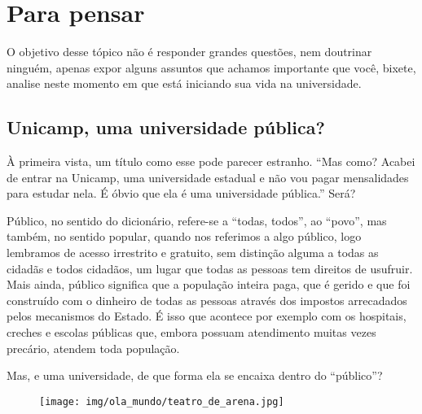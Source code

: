 
\section{Para pensar}

O objetivo desse tópico não é responder grandes questões, nem doutrinar
ninguém, apenas expor alguns assuntos que achamos importante que você, bixete,
analise neste momento em que está iniciando sua vida na universidade.

\subsection*{Unicamp, uma universidade pública?}

À primeira vista, um título como esse pode parecer estranho. ``Mas como? Acabei
de entrar na Unicamp, uma universidade estadual e não vou pagar mensalidades
para estudar nela. É óbvio que ela é uma universidade pública.'' Será?

Público, no sentido do dicionário, refere-se a ``todas, todos'', ao ``povo'',
mas também, no sentido popular, quando nos referimos a algo público, logo
lembramos de acesso irrestrito e gratuito, sem distinção alguma a todas as
cidadãs e todos cidadãos, um lugar que todas as pessoas tem direitos de
usufruir. Mais ainda, público significa que a população inteira paga, que é
gerido e que foi construído com o dinheiro de todas as pessoas através dos
impostos arrecadados pelos mecanismos do Estado. É isso que acontece por
exemplo com os hospitais, creches e escolas públicas que, embora possuam
atendimento muitas vezes precário, atendem toda população.

Mas, e uma universidade, de que forma ela se encaixa dentro do ``público''?

\begin{figure}[h!]
  \centering
  \texttt{[image: img/ola\_mundo/teatro\_de\_arena.jpg]}
\end{figure}

